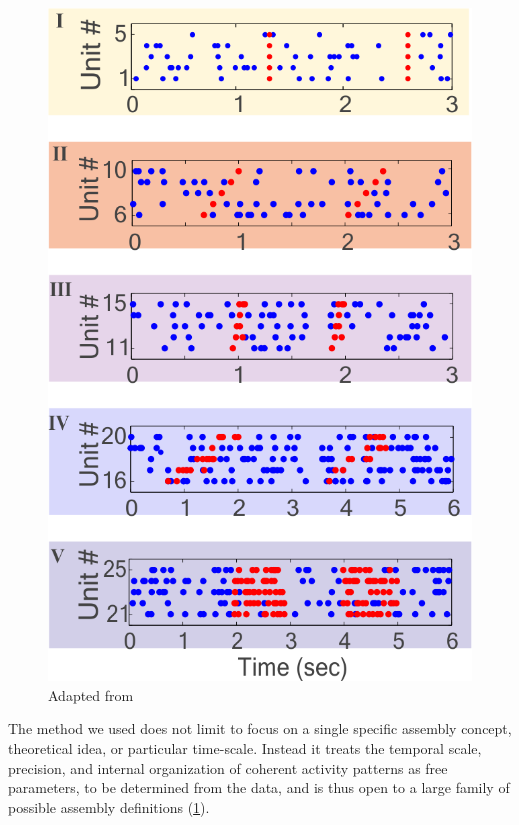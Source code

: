 \begin{figure}
    \centering
    \includegraphics[scale=0.3]{figures/CellAssembliesZoom.png}
    \caption{Adapted from \cite{RussoDurstewitz}}
    \label{fig:CellAsseDet}
\end{figure}
The method we used does not limit to focus on a single specific assembly concept, theoretical idea, or particular time-scale. Instead it treats the temporal scale, precision, and internal organization of coherent activity patterns as free parameters, to be determined from the data, and is thus open to a large family of possible assembly definitions (\ref{fig:CellAsseDet}).
